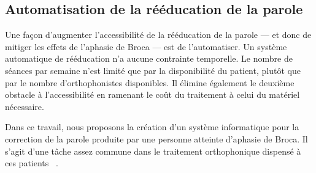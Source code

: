 \subsection{Automatisation de la rééducation de la parole}

Une façon d'augmenter l'accessibilité de la rééducation de la parole 
--- et donc de mitiger les effets de l'aphasie de Broca ---
est de l'automatiser.
Un système automatique de rééducation n'a aucune contrainte temporelle.
Le nombre de séances par semaine n'est limité que par la disponibilité du patient,
plutôt que par le nombre d'orthophonistes disponibles.
Il élimine également le deuxième obstacle à l'accessibilité
en ramenant le coût du traitement à celui du matériel nécessaire.

Dans ce travail, nous proposons la création d'un système informatique 
pour la correction de la parole produite par une personne atteinte d'aphasie de Broca.
Il s'agit d'une tâche assez commune dans le traitement orthophonique dispensé à ces patients%
~\cite{recover,Acharya_Wroten_2022}.